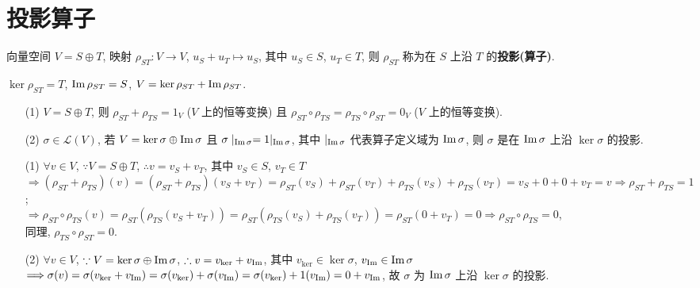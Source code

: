 \documentclass{note}
\begin{document}
\section{投影算子}
\begin{df}[投影(算子)]
    向量空间 $V=S\oplus T$, 映射 $\rho_{ST}:V\rightarrow V$, $u_S+u_T\mapsto u_S$, 其中 $u_S\in S$, $u_T\in T$, 则 $\rho_{ST}$ 称为在 $S$ 上沿 $T$ 的\textbf{投影(算子)}.
\end{df}

$\ker\rho_{ST}=T$, $\operatorname{Im}\rho_{ST}=S$, $V=\ker\rho_{ST}+\operatorname{Im}\rho_{ST}$.

\begin{thm}\label{thm-2.21}
    \begin{itemize}
        \item[(1)] $V=S\oplus T$, 则 $\rho_{ST}+\rho_{TS}=1_V$ ($V$ 上的恒等变换) 且 $\rho_{ST}\circ\rho_{TS}=\rho_{TS}\circ\rho_{ST}=0_V$ ($V$ 上的恒等变换).
        \item[(2)] $\sigma\in\mathcal{L}(V)$, 若 $V=\ker\sigma\oplus\operatorname{Im}\sigma$ 且 $\sigma\mid_{\operatorname{Im}\sigma}=1|_{\operatorname{Im}\sigma}$, 其中 $|_{\operatorname{Im}\sigma}$ 代表算子定义域为 $\operatorname{Im}\sigma$, 则 $\sigma$ 是在 $\operatorname{Im}\sigma$ 上沿 $\ker\sigma$ 的投影.
    \end{itemize}
\end{thm}
\begin{pf}
    \begin{itemize}
        \item[(1)] $\forall v\in V$, $\because V=S\oplus T$, $\therefore v=v_S+v_T$, 其中 $v_S\in S$, $v_T\in T$\\
        $\Longrightarrow(\rho_{ST}+\rho_{TS})(v)=(\rho_{ST}+\rho_{TS})(v_S+v_T)=\rho_{ST}(v_S)+\rho_{ST}(v_T)+\rho_{TS}(v_S)+\rho_{TS}(v_T)=v_S+0+0+v_T=v\Longrightarrow\rho_{ST}+\rho_{TS}=1$;\\
        $\Longrightarrow\rho_{ST}\circ\rho_{TS}(v)=\rho_{ST}(\rho_{TS}(v_S+v_T))=\rho_{ST}(\rho_{TS}(v_S)+\rho_{TS}(v_T))=\rho_{ST}(0+v_T)=0\Longrightarrow\rho_{ST}\circ\rho_{TS}=0$,\\
        同理, $\rho_{TS}\circ\rho_{ST}=0$.
        \item[(2)] $\forall v\in V$, $\because V=\ker\sigma\oplus\operatorname{Im}\sigma$, $\therefore v=v_{\ker}+v_{\operatorname{Im}}$, 其中 $v_{\ker}\in\ker\sigma$, $v_{\operatorname{Im}}\in\operatorname{Im}\sigma$\\
        $\Longrightarrow\sigma(v)=\sigma(v_{\ker}+v_{\operatorname{Im}})=\sigma(v_{\ker})+\sigma(v_{\operatorname{Im}})=\sigma(v_{\ker})+1(v_{\operatorname{Im}})=0+v_{\operatorname{Im}}$, 故 $\sigma$ 为 $\operatorname{Im}\sigma$ 上沿 $\ker\sigma$ 的投影.
    \end{itemize}
\end{pf}
\end{document}
